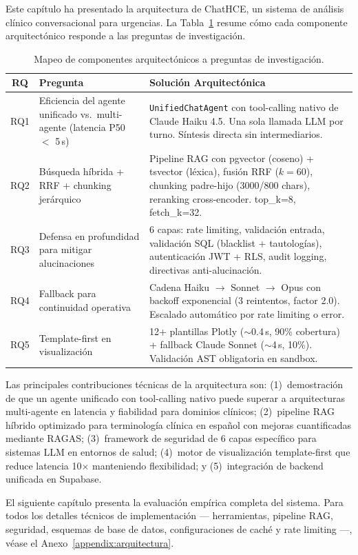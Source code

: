 Este capítulo ha presentado la arquitectura de ChatHCE, un sistema de análisis clínico conversacional para urgencias. La Tabla~\ref{tab:mapeo_rq} resume cómo cada componente arquitectónico responde a las preguntas de investigación.

\begin{table}[t]
\centering
\caption{Mapeo de componentes arquitectónicos a preguntas de investigación.}
\label{tab:mapeo_rq}
\footnotesize
\begin{tabularx}{\textwidth}{cXX}
\toprule
\textbf{RQ} & \textbf{Pregunta} & \textbf{Solución Arquitectónica} \\
\midrule
\ac{RQ}1 & Eficiencia del agente unificado vs.\ multi-agente (latencia P50 $<$ 5\,s) & \texttt{UnifiedChatAgent} con tool-calling nativo de Claude Haiku 4.5. Una sola llamada \ac{LLM} por turno. Síntesis directa sin intermediarios. \\
\addlinespace
\ac{RQ}2 & Búsqueda híbrida + \ac{RRF} + chunking jerárquico & Pipeline \ac{RAG} con pgvector (coseno) + tsvector (léxica), fusión \ac{RRF} ($k=60$), chunking padre-hijo (3000/800 chars), reranking cross-encoder. top\_k=8, fetch\_k=32. \\
\addlinespace
\ac{RQ}3 & Defensa en profundidad para mitigar alucinaciones & 6 capas: rate limiting, validación entrada, validación \ac{SQL} (blacklist + tautologías), autenticación JWT + RLS, audit logging, directivas anti-alucinación. \\
\addlinespace
\ac{RQ}4 & Fallback para continuidad operativa & Cadena Haiku $\rightarrow$ Sonnet $\rightarrow$ Opus con backoff exponencial (3 reintentos, factor 2.0). Escalado automático por rate limiting o error. \\
\addlinespace
\ac{RQ}5 & Template-first en visualización & 12+ plantillas Plotly ($\sim$0.4\,s, 90\% cobertura) + fallback Claude Sonnet ($\sim$4\,s, 10\%). Validación \ac{AST} obligatoria en sandbox. \\
\bottomrule
\end{tabularx}
\end{table}

Las principales contribuciones técnicas de la arquitectura son: (1)~demostración de que un agente unificado con tool-calling nativo puede superar a arquitecturas multi-agente en latencia y fiabilidad para dominios clínicos; (2)~pipeline \ac{RAG} híbrido optimizado para terminología clínica en español con mejoras cuantificadas mediante \ac{RAGAS}; (3)~framework de seguridad de 6 capas específico para sistemas \ac{LLM} en entornos de salud; (4)~motor de visualización template-first que reduce latencia 10$\times$ manteniendo flexibilidad; y (5)~integración de backend unificada en Supabase.

El siguiente capítulo presenta la evaluación empírica completa del sistema. Para todos los detalles técnicos de implementación --- herramientas, pipeline \ac{RAG}, seguridad, esquemas de base de datos, configuraciones de caché y rate limiting ---, véase el Anexo~\ref{appendix:arquitectura}.
